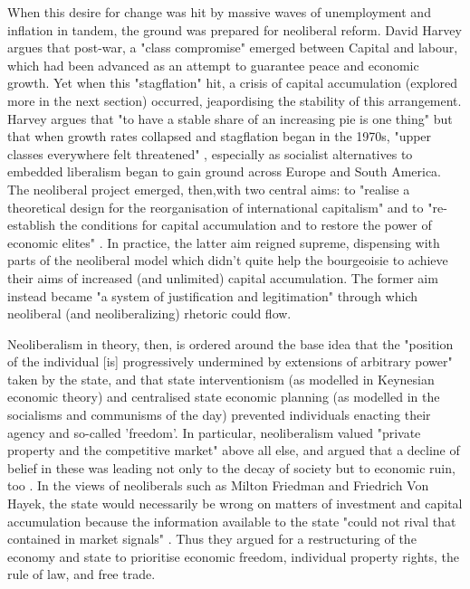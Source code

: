 When this desire for change was hit by massive waves of unemployment and inflation in tandem, the ground was prepared for neoliberal reform.  David Harvey argues that post-war, a "class compromise" \citep[10]{harvey_brief_2007} emerged between Capital and labour, which had been advanced as an attempt to guarantee peace and economic growth. Yet when this "stagflation" \citep[12]{harvey_brief_2007} hit, a crisis of capital accumulation (explored more in the next section) occurred, jeapordising the stability of this arrangement. Harvey argues that "to have a stable share of an increasing pie is one thing" but that when growth rates collapsed and stagflation began in the 1970s, "upper classes everywhere felt threatened" \citep[39]{harvey_brief_2007}, especially as socialist
alternatives to embedded liberalism began to gain ground across Europe and South America. The neoliberal project emerged, then,with two central aims: to "realise a theoretical design for the reorganisation of international capitalism" and to "re-establish the conditions for capital accumulation and to restore the power of economic elites" \citep[45]{harvey_brief_2007}. In practice, the latter aim reigned supreme, dispensing with parts of the neoliberal model which
didn't quite help the bourgeoisie to achieve their aims of increased
(and unlimited) capital accumulation. The former aim instead became "a system of justification and legitimation" \citep[19]{harvey_brief_2007} through which neoliberal (and neoliberalizing) rhetoric could flow.

Neoliberalism in theory, then, is ordered around the base idea that the "position of the individual [is] progressively undermined by extensions of arbitrary power" taken by the state, and that state interventionism (as modelled in Keynesian economic theory) and centralised state economic planning (as modelled in the socialisms and communisms of the day) prevented individuals enacting their agency and so-called 'freedom'. In particular, neoliberalism valued "private property and the competitive market" above all else, and argued that a decline of belief in these was leading not only to the decay of society but to economic ruin, too \citep[MONT PELERIN SOCIETY]{}. In the views of neoliberals such as Milton Friedman and Friedrich Von Hayek, the state would necessarily be wrong on matters of investment and capital accumulation because the information available to the state "could not rival that contained in market signals" \citep[49]{harvey_brief_2007}. Thus they argued for a restructuring of the economy and state to prioritise economic freedom, individual property rights, the rule of law, and free trade.

